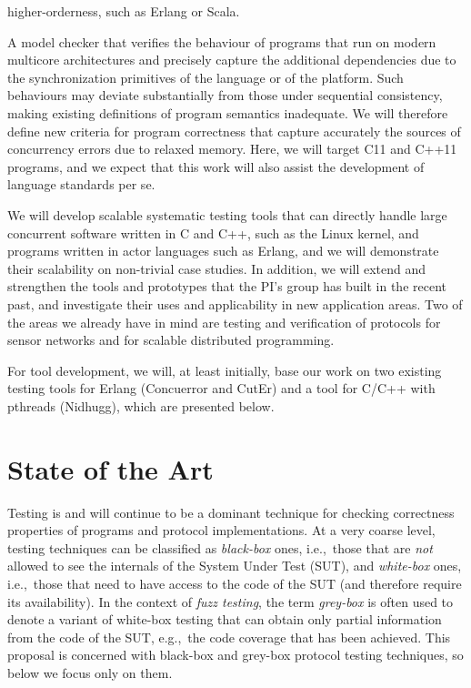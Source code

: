 \documentclass[11pt]{article}
\newcommand{\system}[1]{\mbox{\textsf{#1}}}
\newcommand{\eg}{e.\/g.,\ }
\newcommand{\ie}{i.\/e.,\ }
\begin{document}
{\begin{description}
\begin{inparaenum}[(i)]
      higher-orderness, such as Erlang or Scala.
    \item A model checker that verifies the behaviour of programs that
      run on modern multicore architectures and precisely capture the
      additional dependencies due to the synchronization primitives of
      the language or of the platform. Such behaviours may deviate
      substantially from those under sequential consistency, making
      existing definitions of program semantics inadequate. We will
      therefore define new criteria for program correctness that
      capture accurately the sources of concurrency errors due to
      relaxed memory. Here, we will target C11 and C++11 programs, and
      we expect that this work will also assist the development of
      language standards per se.
  \end{inparaenum}
\item[Tools and Case Studies.] We will develop scalable systematic testing
  tools that can directly handle large concurrent software written in C and
  C++, such as the Linux kernel, and programs written in actor languages
  such as Erlang, and we will demonstrate their scalability on non-trivial
  case studies. In addition, we will extend and strengthen the tools and
  prototypes that the PI's group has built in the recent past, and
  investigate their uses and applicability in new application areas. Two of
  the areas we already have in mind are testing and verification of
  protocols for sensor networks
  and for scalable distributed programming.
\end{description}

For tool development, we will, at least initially, base our work on
two existing testing tools for Erlang (\system{Concuerror} and
\system{CutEr}) and a tool for C/C++ with pthreads (\system{Nidhugg}),
which are presented below.
}

\section{State of the Art}
Testing is and will continue to be a dominant technique for checking
correctness properties of programs and protocol implementations.  At a very
coarse level, testing techniques can be classified as \emph{black-box} ones,
\ie those that are \emph{not} allowed to see the internals of the System Under
Test (SUT), and \emph{white-box} ones, \ie those that need to have access to
the code of the SUT (and therefore require its availability).  In the context
of \emph{fuzz testing}, the term \emph{grey-box} is often used to denote a
variant of white-box testing that can obtain only partial information from the
code of the SUT, \eg the code coverage that has been achieved.
%
This proposal is concerned with black-box and grey-box protocol testing
techniques, so below we focus only on them.
\end{document}
